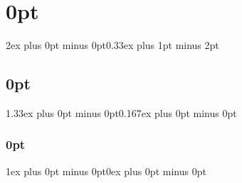


\raggedbottom 

\titlespacing\section{0pt}{2ex plus 0pt minus 0pt}{0.33ex plus 1pt minus 2pt}
\titlespacing\subsection{0pt}{1.33ex plus 0pt minus 0pt}{0.167ex plus 0pt minus 0pt}
\titlespacing\subsubsection{0pt}{1ex plus 0pt minus 0pt}{0ex plus 0pt minus 0pt}

\setlength{\parindent}{0pt}
\setlength{\parskip}{1ex plus 0ex minus 0ex}

\setcounter{secnumdepth}{0}

\newcommand{\greyHeader}[1]{
	\setlength{\fboxsep}{0.5em}
	\setlength{\fboxrule}{0pt}
	\vspace{1.5ex}
	\fcolorbox
		{GreyBkgdColor}
		{GreyBkgdColor}
		{\strong{#1}}
	\vspace{0.25ex}
}

